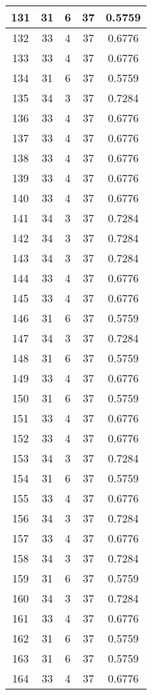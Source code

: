 \documentclass[letterpaper, 12pt]{article}
\begin{document}
\begin{longtable}{|c|c|c|c|c|}
\hline
131 & 31 & 6 & 37 & 0.5759 \\
\hline
132 & 33 & 4 & 37 & 0.6776 \\
\hline
133 & 33 & 4 & 37 & 0.6776 \\
\hline
134 & 31 & 6 & 37 & 0.5759 \\
\hline
135 & 34 & 3 & 37 & 0.7284 \\
\hline
136 & 33 & 4 & 37 & 0.6776 \\
\hline
137 & 33 & 4 & 37 & 0.6776 \\
\hline
138 & 33 & 4 & 37 & 0.6776 \\
\hline
139 & 33 & 4 & 37 & 0.6776 \\
\hline
140 & 33 & 4 & 37 & 0.6776 \\
\hline
141 & 34 & 3 & 37 & 0.7284 \\
\hline
142 & 34 & 3 & 37 & 0.7284 \\
\hline
143 & 34 & 3 & 37 & 0.7284 \\
\hline
144 & 33 & 4 & 37 & 0.6776 \\
\hline
145 & 33 & 4 & 37 & 0.6776 \\
\hline
146 & 31 & 6 & 37 & 0.5759 \\
\hline
147 & 34 & 3 & 37 & 0.7284 \\
\hline
148 & 31 & 6 & 37 & 0.5759 \\
\hline
149 & 33 & 4 & 37 & 0.6776 \\
\hline
150 & 31 & 6 & 37 & 0.5759 \\
\hline
151 & 33 & 4 & 37 & 0.6776 \\
\hline
152 & 33 & 4 & 37 & 0.6776 \\
\hline
153 & 34 & 3 & 37 & 0.7284 \\
\hline
154 & 31 & 6 & 37 & 0.5759 \\
\hline
155 & 33 & 4 & 37 & 0.6776 \\
\hline
156 & 34 & 3 & 37 & 0.7284 \\
\hline
157 & 33 & 4 & 37 & 0.6776 \\
\hline
158 & 34 & 3 & 37 & 0.7284 \\
\hline
159 & 31 & 6 & 37 & 0.5759 \\
\hline
160 & 34 & 3 & 37 & 0.7284 \\
\hline
161 & 33 & 4 & 37 & 0.6776 \\
\hline
162 & 31 & 6 & 37 & 0.5759 \\
\hline
163 & 31 & 6 & 37 & 0.5759 \\
\hline
164 & 33 & 4 & 37 & 0.6776 \\

\end{longtable}
\end{document}
